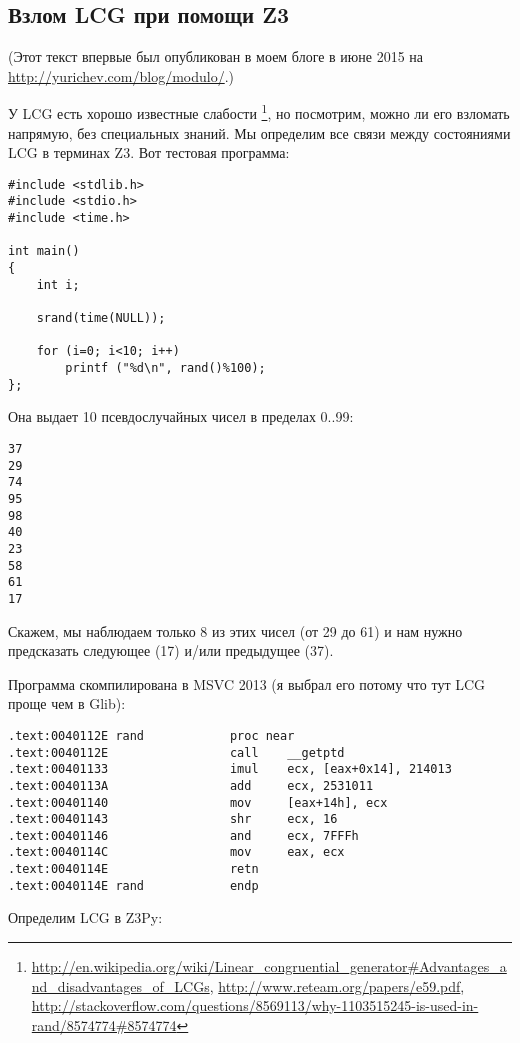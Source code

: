 \subsection{Взлом \ac{LCG} при помощи Z3}

(Этот текст впервые был опубликован в моем блоге в июне 2015 на \url{http://yurichev.com/blog/modulo/}.)

У \ac{LCG} есть хорошо известные слабости
\footnote{\url{http://en.wikipedia.org/wiki/Linear_congruential_generator\#Advantages_and_disadvantages_of_LCGs},
\url{http://www.reteam.org/papers/e59.pdf},
\url{http://stackoverflow.com/questions/8569113/why-1103515245-is-used-in-rand/8574774\#8574774}},
но посмотрим, можно ли его взломать напрямую, без специальных знаний.
Мы определим все связи между состояниями LCG в терминах Z3.
Вот тестовая программа:

\begin{lstlisting}
#include <stdlib.h>
#include <stdio.h>
#include <time.h>

int main()
{
	int i;

	srand(time(NULL));

	for (i=0; i<10; i++)
		printf ("%d\n", rand()%100);
};
\end{lstlisting}

Она выдает 10 псевдослучайных чисел в пределах 0..99:

\begin{lstlisting}
37
29
74
95
98
40
23
58
61
17
\end{lstlisting}

Скажем, мы наблюдаем только 8 из этих чисел (от 29 до 61) и нам нужно предсказать следующее (17) и/или предыдущее (37).

Программа скомпилирована в MSVC 2013 (я выбрал его потому что тут LCG проще чем в Glib):

\begin{lstlisting}
.text:0040112E rand            proc near
.text:0040112E                 call    __getptd
.text:00401133                 imul    ecx, [eax+0x14], 214013
.text:0040113A                 add     ecx, 2531011
.text:00401140                 mov     [eax+14h], ecx
.text:00401143                 shr     ecx, 16
.text:00401146                 and     ecx, 7FFFh
.text:0040114C                 mov     eax, ecx
.text:0040114E                 retn
.text:0040114E rand            endp
\end{lstlisting}

Определим \ac{LCG} в Z3Py:

